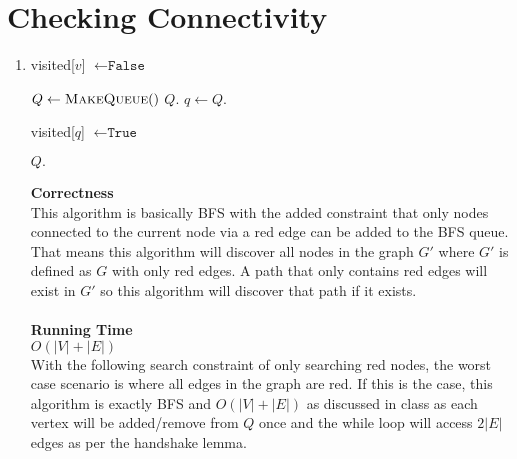 \documentclass{article}
\begin{document}
\section{Checking Connectivity}
\begin{enumerate}
    \item

        \begin{algorithmic}
                    \State visited[$v$] $\gets \texttt{False}$
                \EndFor

                \State $Q \gets \Call{MakeQueue}{\null}$ 
                \State $Q.$
                    \State $q \gets Q.$
                    \EndIf

                    \State visited[$q$] $\gets \texttt{True}$

                            \State $Q.$
                        \EndIf
                    \EndFor
                \EndWhile

            \EndFunction
            \end{algorithmic}
        
        
        \textbf{Correctness} \\
        This algorithm is basically BFS with the added constraint that only nodes connected to the current node via a red edge can be added to the BFS queue.
        That means this algorithm will discover all nodes in the graph $G'$ where $G'$ is defined as $G$ with only red edges.
        A path that only contains red edges will exist in $G'$ so this algorithm will discover that path if it exists. \\\\
        \textbf{Running Time} \\
        $O(|V| + |E|)$ \\
        With the following search constraint of only searching red nodes, the worst case scenario is 
        where all edges in the graph are red. If this is the case, this algorithm is exactly BFS and $O(|V| + |E|)$ as discussed in class as
        each vertex will be added/remove from $Q$ once and the while loop will access $2|E|$ edges as per the handshake lemma.


\end{enumerate}
\end{document}
